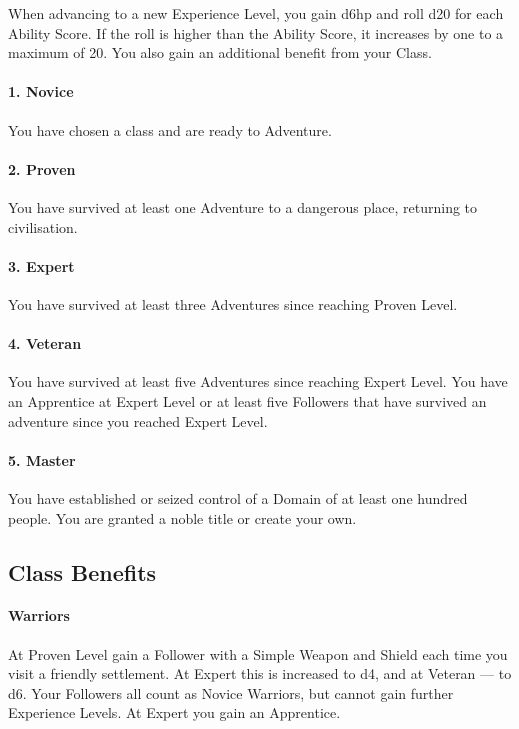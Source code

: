 \documentclass[itdr]{subfiles}
\begin{document}
When advancing to a new Experience Level, you gain d6hp and roll d20 for each Ability Score. If the roll is higher than the Ability Score, it increases by one to a maximum of 20. You also gain an additional benefit from your Class.

\paragraph{1. Novice}
You have chosen a class and are ready to Adventure.

\paragraph{2. Proven}
You have survived at least one Adventure to a dangerous place, returning to civilisation.

\paragraph{3. Expert}
You have survived at least three Adventures since reaching Proven Level.

\paragraph{4. Veteran}
You have survived at least five Adventures since reaching Expert Level. You have an Apprentice at Expert Level or at least five Followers that have survived an adventure since you reached Expert Level.

\paragraph{5. Master}

You have established or seized control of a Domain of at least one hundred people. You are granted a noble title or create your own.

\vfill
\break

\subsection{Class Benefits}

\paragraph{Warriors}
At Proven Level gain a Follower with a Simple Weapon and Shield each time you visit a friendly settlement. At Expert this is increased to d4, and at Veteran --- to d6. Your Followers all count as Novice Warriors, but cannot gain further Experience Levels. At Expert you gain an Apprentice.
\end{document}
